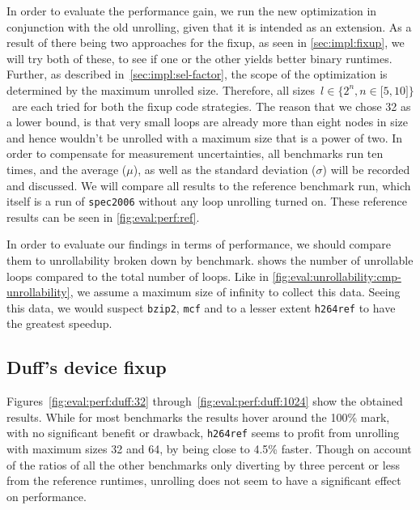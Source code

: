 In order to evaluate the performance gain, we run the new optimization in conjunction with the old unrolling, given that it is intended as an extension.
As a result of there being two approaches for the fixup, as seen in \cref{sec:impl:fixup}, we will try both of these, to see if one or the other yields better binary runtimes.
Further, as described in~\cref{sec:impl:sel-factor}, the scope of the optimization is determined by the maximum unrolled size.
Therefore, all sizes~$l \in \{2^n, n \in \lbrack 5, 10 \rbrack \}$~are each tried for both the fixup code strategies.
The reason that we chose 32 as a lower bound, is that very small loops are already more than eight nodes in size and hence wouldn't be unrolled with a maximum size that is a power of two.
In order to compensate for measurement uncertainties, all benchmarks run ten times, and the average ($\mu$), as well as the standard deviation ($\sigma$) will be recorded and discussed.
We will compare all results to the reference benchmark run, which itself is a run of \texttt{spec2006} without any loop unrolling turned on.
These reference results can be seen in \cref{fig:eval:perf:ref}.

In order to evaluate our findings in terms of performance, we should compare them to unrollability broken down by benchmark.
 shows the number of unrollable loops compared to the total number of loops.
Like in \cref{fig:eval:unrollability:cmp-unrollability}, we assume a maximum size of infinity to collect this data.
Seeing this data, we would suspect \texttt{bzip2}, \texttt{mcf} and to a lesser extent \texttt{h264ref} to have the greatest speedup.





\newpage

\subsection{Duff's device fixup}\label{sec:eval:perf:duff}

Figures~\ref{fig:eval:perf:duff:32} through~\ref{fig:eval:perf:duff:1024} show the obtained results.
While for most benchmarks the results hover around the 100\% mark, with no significant benefit or drawback, \texttt{h264ref} seems to profit from unrolling with maximum sizes 32 and 64, by being close to 4.5\% faster.
Though on account of the ratios of all the other benchmarks only diverting by three percent or less from the reference runtimes, unrolling does not seem to have a significant effect on performance.

